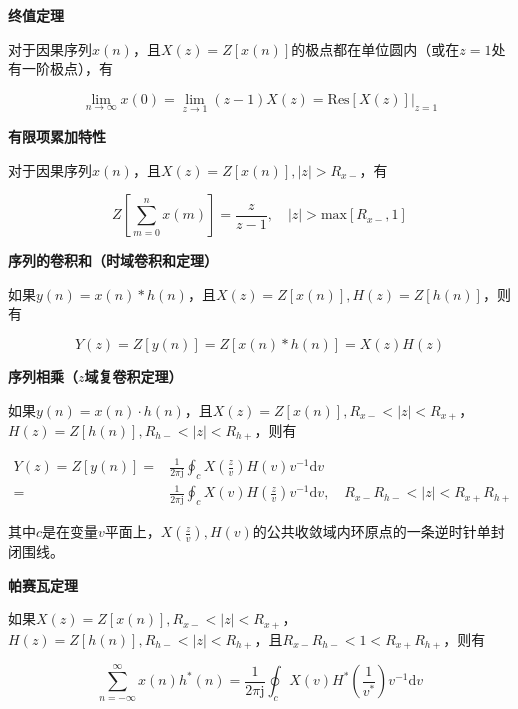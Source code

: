\documentclass[cn, hazy, blue, normal, 14pt]{elegantnote}
\begin{document}
\textbf{终值定理}

对于因果序列$x(n)$，且$X(z)=Z[x(n)]$的极点都在单位圆内（或在$z=1$处有一阶极点），有

\begin{equation}
        \lim_{n\rightarrow\infty}{x(0)}=\lim_{z\rightarrow 1}{(z-1)X(z)}=\text{Res}\left.[X(z)]\right|_{z=1}
\end{equation}

\textbf{有限项累加特性}

对于因果序列$x(n)$，且$X(z)=Z[x(n)], |z|>R_{x-}$，有

\begin{equation}
        Z\left[\sum_{m=0}^{n}{x(m)}\right]=\frac{z}{z-1}, \quad |z|>\text{max}[R_{x-}, 1]
\end{equation}

\textbf{序列的卷积和（时域卷积和定理）}

如果$y(n)=x(n)\ast h(n)$，且$X(z)=Z\left[x(n)\right], H(z)=Z\left[h(n)\right]$，则有

\begin{equation}
        Y(z)=Z\left[y(n)\right]=Z\left[x(n)\ast h(n)\right]=X(z)H(z)
\end{equation}

\textbf{序列相乘（$z$域复卷积定理）}

如果$y(n)=x(n)\cdot h(n)$，且$X(z)=Z\left[x(n)\right], R_{x-}<|z|<R_{x+}$，$H(z)=Z\left[h(n)\right], R_{h-}<|z|<R_{h+}$，则有

\begin{equation}
\begin{aligned}
        Y(z)=Z\left[y(n)\right]=&\frac{1}{2\pi\text{j}}\oint_c{X\left(\frac{z}{v}\right)H(v)v^{-1}\text{d}v} \\
    =&\frac{1}{2\pi\text{j}}\oint_c{X(v)H\left(\frac{z}{v}\right)v^{-1}\text{d}v}, \quad R_{x-}R_{h-}<|z|<R_{x+}R_{h+}
\end{aligned}
\end{equation}

其中$c$是在变量$v$平面上，$X\left(\frac{z}{v}\right), H(v)$的公共收敛域内环原点的一条逆时针单封闭围线。

\textbf{帕赛瓦定理}

如果$X(z)=Z\left[x(n)\right], R_{x-}<|z|<R_{x+}$，$H(z)=Z\left[h(n)\right], R_{h-}<|z|<R_{h+}$，且$R_{x-}R_{h-}<1<R_{x+}R_{h+}$，则有

\begin{equation}
        \sum_{n=-\infty}^{\infty}{x(n)h^*(n)}=\frac{1}{2\pi\text{j}}\oint_c{X(v)H^*\left(\frac{1}{v^*}\right)v^{-1}\text{d}v}
\end{equation}
\end{document}
